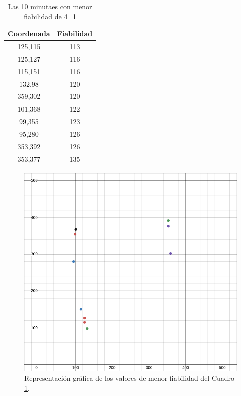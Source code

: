 \documentclass[10pt,a4paper]{article}
\begin{document}
\begin{enumerate}[label=\textbf{\alph*)}]
\begin{table}[h!]
\centering
\begin{tabular}{|c|c|}
\hline
 \textbf{Coordenada} & \textbf{Fiabilidad} \\ \hline
 125,115 & 113 \\ \hline
 125,127 & 116 \\ \hline
 115,151 & 116 \\ \hline
 132,98 & 120 \\ \hline
 359,302 & 120 \\ \hline
 101,368 & 122 \\ \hline
 99,355 & 123 \\ \hline
 95,280 & 126 \\ \hline
 353,392 & 126 \\ \hline
 353,377 & 135 \\ \hline
\end{tabular}
  \caption{Las 10 minutaes con menor fiabilidad de 4\_1}
  \label{tabla:bad}
\end{table}

\begin{figure}[h!]
\centering
  \includegraphics[width=.4\linewidth]{bad.png}
  \caption{Representación gráfica de los valores de menor fiabilidad del Cuadro \ref{tabla:bad}.}
  \label{fig:bad}
\end{figure}



\end{enumerate}

\pagebreak

\subsection{}
\end{document}
